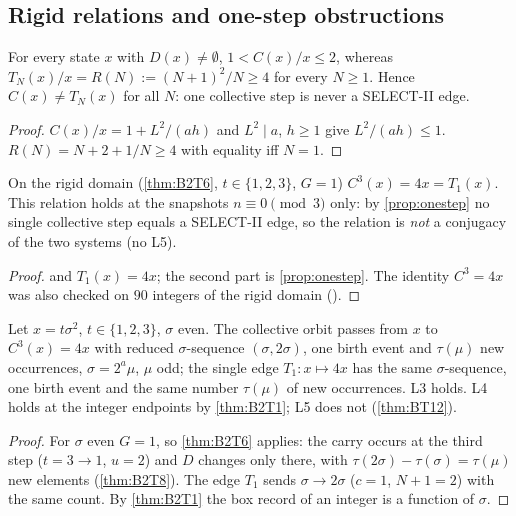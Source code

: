 \subsection{Rigid relations and one-step obstructions}
\begin{proposition}\label{prop:onestep}
For every state $x$ with $D(x)\ne\emptyset$, $1<C(x)/x\le2$, whereas $T_N(x)/x=R(N):=(N+1)^2/N\ge4$ for every $N\ge1$. Hence $C(x)\ne T_N(x)$ for all $N$: one collective step is never a SELECT-II edge.
\end{proposition}
\begin{proof}
$C(x)/x=1+L^2/(ah)$ and $L^2\mid a$, $h\ge1$ give $L^2/(ah)\le1$. $R(N)=N+2+1/N\ge4$ with equality iff $N=1$. \qedhere
\end{proof}
\begin{theorem}\label{thm:BT12}
On the rigid domain (\cref{thm:B2T6}, $t\in\{1,2,3\}$, $G=1$) $C^3(x)=4x=T_1(x)$. This relation holds at the snapshots $n\equiv0\pmod3$ only: by \cref{prop:onestep} no single collective step equals a SELECT-II edge, so the relation is \emph{not} a conjugacy of the two systems (no L5).
\end{theorem}
\begin{proof}
 and $T_1(x)=4x$; the second part is \cref{prop:onestep}. The identity $C^3=4x$ was also checked on $90$ integers of the rigid domain (). \qedhere
\end{proof}
\begin{theorem}\label{thm:B2T10}
Let $x=t\sigma^2$, $t\in\{1,2,3\}$, $\sigma$ even. The collective orbit passes from $x$ to $C^3(x)=4x$ with reduced $\sigma$-sequence $(\sigma,2\sigma)$, one birth event and $\tau(\mu)$ new occurrences, $\sigma=2^a\mu$, $\mu$ odd; the single edge $T_1:x\mapsto4x$ has the same $\sigma$-sequence, one birth event and the same number $\tau(\mu)$ of new occurrences. L3 holds. L4 holds at the integer endpoints by \cref{thm:B2T1}; L5 does not (\cref{thm:BT12}).
\end{theorem}
\begin{proof}
For $\sigma$ even $G=1$, so \cref{thm:B2T6} applies: the carry occurs at the third step ($t=3\to1$, $u=2$) and $D$ changes only there, with $\tau(2\sigma)-\tau(\sigma)=\tau(\mu)$ new elements (\cref{thm:B2T8}). The edge $T_1$ sends $\sigma\to2\sigma$ ($c=1$, $N+1=2$) with the same count. By \cref{thm:B2T1} the box record of an integer is a function of $\sigma$. \qedhere
\end{proof}

